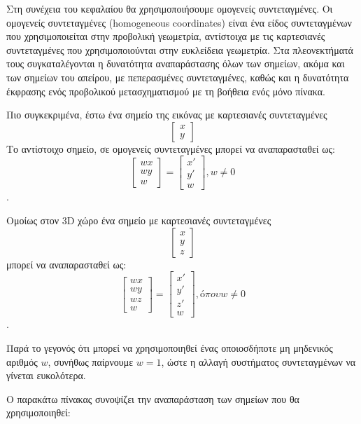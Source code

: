 Στη συνέχεια του κεφαλαίου θα χρησιμοποιήσουμε ομογενείς συντεταγμένες. Οι ομογενείς συντεταγμένες (homogeneous coordinates) είναι ένα είδος συντεταγμένων που χρησιμοποιείται στην προβολική γεωμετρία, αντίστοιχα με τις καρτεσιανές συντεταγμένες που χρησιμοποιούνται στην ευκλείδεια γεωμετρία. Στα πλεονεκτήματά τους συγκαταλέγονται η δυνατότητα αναπαράστασης όλων των σημείων, ακόμα και των σημείων του απείρου, με πεπερασμένες συντεταγμένες, καθώς και η δυνατότητα έκφρασης ενός προβολικού μετασχηματισμού με τη βοήθεια ενός μόνο πίνακα.

Πιο συγκεκριμένα, έστω ένα σημείο της εικόνας με καρτεσιανές συντεταγμένες \[\begin{bmatrix} x \\ y \end{bmatrix}\]
Το αντίστοιχο σημείο, σε ομογενείς συντεταγμένες μπορεί να αναπαρασταθεί ως: \[\begin{bmatrix} wx \\ wy \\ w\end{bmatrix}=
\begin{bmatrix}x'\\y'\\w\end{bmatrix} , w\neq0 \].

Ομοίως στον 3D χώρο ένα σημείο με καρτεσιανές συντεταγμένες \[\begin{bmatrix} x \\ y \\ z \end{bmatrix}\] μπορεί να αναπαρασταθεί ως: \[\begin{bmatrix} wx \\ wy \\ wz \\ w\end{bmatrix}=
\begin{bmatrix}x'\\y'\\z' \\ w\end{bmatrix} , όπου w\neq0 \].


Παρά το γεγονός ότι μπορεί να χρησιμοποιηθεί ένας οποιοσδήποτε μη μηδενικός αριθμός $w$, συνήθως παίρνουμε $w=1$, ώστε η αλλαγή συστήματος συντεταγμένων να γίνεται ευκολότερα.

Ο παρακάτω πίνακας συνοψίζει την αναπαράσταση των σημείων που θα χρησιμοποιηθεί:




